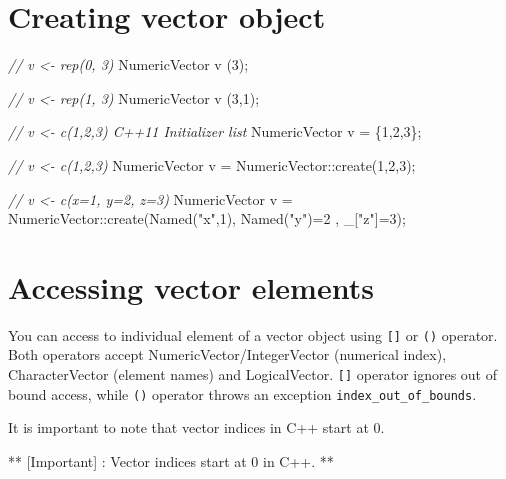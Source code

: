 \documentclass[]{book}
\newenvironment{Shaded}{\begin{snugshade}}{\end{snugshade}}
\newcommand{\DecValTok}[1]{\textcolor[rgb]{0.00,0.00,0.81}{#1}}
\newcommand{\StringTok}[1]{\textcolor[rgb]{0.31,0.60,0.02}{#1}}
\newcommand{\CommentTok}[1]{\textcolor[rgb]{0.56,0.35,0.01}{\textit{#1}}}
\newcommand{\NormalTok}[1]{#1}
\theoremstyle{definition}
\theoremstyle{definition}
\theoremstyle{remark}
\begin{document}
\section{Creating vector object}\label{creating-vector-object}

\begin{Shaded}
\begin{Highlighting}[]
\CommentTok{// v <- rep(0, 3)}
\NormalTok{NumericVector v (}\DecValTok{3}\NormalTok{);}

\CommentTok{// v <- rep(1, 3)}
\NormalTok{NumericVector v (}\DecValTok{3}\NormalTok{,}\DecValTok{1}\NormalTok{);}

\CommentTok{// v <- c(1,2,3) C++11 Initializer list}
\NormalTok{NumericVector v = \{}\DecValTok{1}\NormalTok{,}\DecValTok{2}\NormalTok{,}\DecValTok{3}\NormalTok{\};}

\CommentTok{// v <- c(1,2,3)}
\NormalTok{NumericVector v = NumericVector::create(}\DecValTok{1}\NormalTok{,}\DecValTok{2}\NormalTok{,}\DecValTok{3}\NormalTok{);}

\CommentTok{// v <- c(x=1, y=2, z=3)}
\NormalTok{NumericVector v =}
\NormalTok{  NumericVector::create(Named(}\StringTok{"x"}\NormalTok{,}\DecValTok{1}\NormalTok{), Named(}\StringTok{"y"}\NormalTok{)=}\DecValTok{2}\NormalTok{ , _[}\StringTok{"z"}\NormalTok{]=}\DecValTok{3}\NormalTok{);}
\end{Highlighting}
\end{Shaded}

\section{Accessing vector elements}\label{accessing-vector-elements}

You can access to individual element of a vector object using
\texttt{{[}{]}} or \texttt{()} operator. Both operators accept
NumericVector/IntegerVector (numerical index), CharacterVector (element
names) and LogicalVector. \texttt{{[}{]}} operator ignores out of bound
access, while \texttt{()} operator throws an exception
\texttt{index\_out\_of\_bounds}.

It is important to note that vector indices in C++ start at 0.

** {[}Important{]} : Vector indices start at 0 in C++. **
\end{document}
